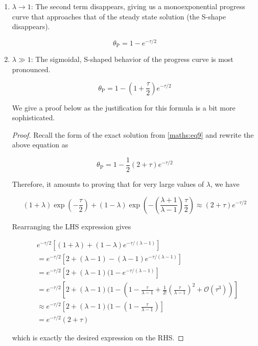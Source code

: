 \documentclass{article}
\newcommand{\thetaP}{\theta_{\text{P}}}
\begin{document}
\begin{enumerate}[label=(\roman*)]
    \item $\lambda \to 1$: The second term disappears, giving us a monoexponential progress curve that approaches that of the steady state solution (the S-shape disappears).

    \begin{equation}\label{maths:eq10}
    \thetaP = 1 - e^{-\tau / 2}
    \end{equation}
    \item $\lambda \gg 1$: The sigmoidal, S-shaped behavior of the progress curve is most pronounced.

    \begin{equation}\label{maths:eq11}
    \thetaP = 1 - \left( 1 + \frac{\tau}{2} \right) e^{-\tau / 2}
    \end{equation}

    We give a proof below as the justification for this formula is a bit more sophisticated.

    \begin{proof}
        Recall the form of the exact solution from \eqref{maths:eq9} and rewrite the above equation as

        \[
        \thetaP = 1 - \frac{1}{2}\left( 2 + \tau \right) e^{-\tau / 2}
        \]

        Therefore, it amounts to proving that for very large values of $\lambda$, we have

        \[
        (1 + \lambda)\exp\left( -\frac{\tau}{2} \right) + (1 - \lambda) \exp\left( -\left( \frac{\lambda + 1}{\lambda - 1} \right)\frac{\tau}{2} \right) \approx (2 + \tau) e^{-\tau / 2}
        \]

        Rearranging the LHS expression gives

        \begin{align*}
            &e^{-\tau / 2} \left[ (1 + \lambda) + (1 - \lambda) e^{-\tau / (\lambda - 1)} \right] \\[5pt]
            &= e^{-\tau / 2} \left[ 2 + (\lambda - 1) - (\lambda - 1) e^{-\tau / (\lambda - 1)}\right] \\[5pt]
            &= e^{-\tau / 2} \left[ 2 + (\lambda - 1) (1 - e^{-\tau / (\lambda - 1)}\right] \\[5pt]
            &= e^{-\tau / 2} \left[ 2 + (\lambda - 1) (1 - \left( 1 - \frac{\tau}{\lambda - 1} + \frac{1}{2!} \left( \frac{\tau}{\lambda - 1} \right)^2 + \mathcal{O}(\tau^3) \right) \right] \\[5pt]
            &\approx e^{-\tau / 2} \left[ 2 + (\lambda - 1) (1 - \left( 1 - \frac{\tau}{\lambda - 1} \right) \right] \\[5pt]
            &= e^{-\tau / 2} (2 + \tau)
        \end{align*}

        which is exactly the desired expression on the RHS.
    \end{proof}
\end{enumerate}
\end{document}
